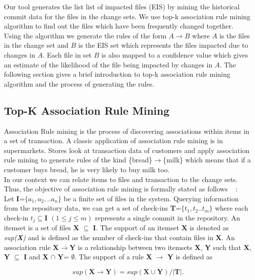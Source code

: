 Our tool generates the list list of impacted files (EIS) by mining the historical commit data for the files in the change sets. We use top-k association rule mining algorithm to find out the files which have been frequently changed together. Using the algorithm we generate the rules of the form $A \rightarrow B$ where $A$ is the files in the change set and $B$ is the EIS set which represents the files impacted due to changes in $A$. Each file in set $B$ is also mapped to a confidence value which gives an estimate of the likelihood of the file being impacted by changes in $A$. The following section gives a brief introduction to top-k association rule mining algorithm and the process of generating the rules.\\  

\subsection{Top-K Association Rule Mining}

Association Rule mining is the process of discovering associations within items in a set of transaction. A classic application of association rule mining is in supermarkets. Stores look at transaction data of customers and apply association rule mining to generate rules of the kind \{bread\}$\rightarrow$\{milk\} which means that if a customer buys bread, he is very likely to buy milk too.\\
In our context we can relate items to files and transaction to the change sets. Thus, the objective of association rule mining is formally stated as follows ~\cite{fournier2012mining} :\\
Let \textbf{I}=$\{a_{1},a_{2},..a_{n}\}$ be a finite set of files in the system. Querying information from the repository data, we can get a set of check-ins \textbf{T}=$\{t_{1},t_{2}..t_{m}\}$ where each check-in $t_{j}\subseteq\textbf{I}$ $(1 \le j \le m)$ represents a single commit in the repository. An itemset is a set of files \textbf{X} $\subseteq$ \textbf{I}. The support of an itemset \textbf{X} is denoted as \textit{sup(\textbf{X})} and is defined as the number of check-ins that contain files in \textbf{X}. An association rule \textbf{X}$\rightarrow$\textbf{Y} is a relationship between two itemsets \textbf{X}, \textbf{Y} such that \textbf{X}, \textbf{Y} $\subseteq$ \textbf{I} and \textbf{X} $\cap$ \textbf{Y}= $\emptyset$. The support of a rule \textbf{X} $\rightarrow$ \textbf{Y} is defined as 

\begin{equation}
\textit{sup}(\textbf{X} \rightarrow \textbf{Y}) = \textit{sup}(\textbf{X}\cup\textbf{Y}) / |\textbf{T}|.
\end{equation}
 

